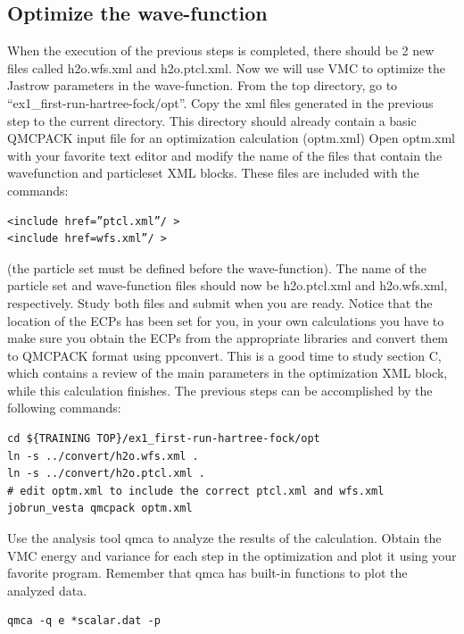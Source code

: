 \subsection{Optimize the wave-function}
When the execution of the previous steps is completed, there should be 2 new
files called h2o.wfs.xml and h2o.ptcl.xml. Now we will use VMC to optimize the 
Jastrow parameters in the wave-function.  From the top directory, go to
``ex1\_first-run-hartree-fock/opt''. Copy the xml files generated in the previous step
to the current directory. This directory should already contain a basic QMCPACK input
file for an optimization calculation (optm.xml) %
Open optm.xml with your favorite text editor and modify the name of the files that contain the
wavefunction and particleset XML blocks. These files are included with the commands:
\begin{shaded}
\begin{verbatim}
<include href=”ptcl.xml”/ >
<include href=wfs.xml”/ >
\end{verbatim}
\end{shaded}
(the particle set must be
defined before the wave-function). The name of the particle set and wave-function files should now be h2o.ptcl.xml
and h2o.wfs.xml, respectively. Study both files and submit when you are ready. Notice that the
location of the ECPs has been set for you, in your own calculations you have to make
sure you obtain the ECPs from the appropriate libraries and convert them to QMCPACK
format using ppconvert. This is a good time to study section C, which contains a review
of the main parameters in the optimization XML block, while this calculation finishes. The
previous steps can be accomplished by the following commands:
\begin{shaded}
\begin{verbatim}
cd ${TRAINING TOP}/ex1_first-run-hartree-fock/opt
ln -s ../convert/h2o.wfs.xml .
ln -s ../convert/h2o.ptcl.xml .
# edit optm.xml to include the correct ptcl.xml and wfs.xml
jobrun_vesta qmcpack optm.xml
\end{verbatim}
\end{shaded}

Use the analysis tool qmca to analyze the results of the calculation. Obtain the VMC
energy and variance for each step in the optimization and plot it using your favorite program.
Remember that qmca has built-in functions to plot the analyzed data.
\begin{shaded}
\begin{verbatim}
qmca -q e *scalar.dat -p
\end{verbatim}
\end{shaded}

